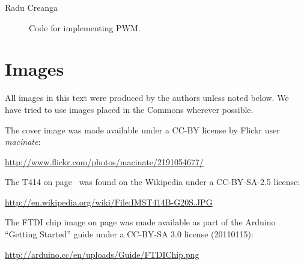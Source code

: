 \begin{description}
	\item[Radu Creanga] Code for implementing PWM.
\end{description}

\newpage

\section{Images}
All images in this text were produced by the authors unless noted below. We have tried to use images placed in the Commons wherever possible.

The cover image was made available under a CC-BY license by Flickr user {\em macinate}:

\small{\url{http://www.flickr.com/photos/macinate/2191054677/}}

The T414 on page~\pageref{image:t414} was found on the Wikipedia under a CC-BY-SA-2.5 license:

\small{\url{http://en.wikipedia.org/wiki/File:IMST414B-G20S.JPG}}

\begin{comment}
The juggling LEGO figure on page \pageref{image:juggling} was made available by Flickr user {\em helico} under a CC-BY license:

\small{\url{http://www.flickr.com/photos/helico/404640681/}}

The image for ``waiting'' on page \pageref{medio:waiting} was made available by Flickr user {\em red twolips} under a CC-BY license:

\small{\url{http://www.flickr.com/photos/25182350@N03/2957915812/}}

The image for ``pipeline'' on page \pageref{image:scotland-pipeline} was made available by Flickr user {\em nz\_willowherb} under a CC-BY license:

\small{\url{http://www.flickr.com/photos/willowherb/3320805930/}}

The image for delta PWM on page \pageref{image:ch7-delta-pwm} was made available by Cyril Buttay under a CC-BY-SA license:

\small{\url{http://en.wikipedia.org/wiki/File:Delta_PWM.png}}
\end{comment}

The FTDI chip image on page \pageref{image:ftdi-chip} was made available as part of the Arduino ``Getting Started'' guide under a CC-BY-SA 3.0 license (20110115):

\small{\url{http://arduino.cc/en/uploads/Guide/FTDIChip.png}}

